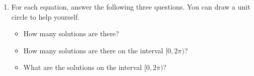 \documentclass{article}
\begin{document}
\begin{enumerate}
\begin{tasks}[after-item-skip=64pt]
    \task 
      \begin{problem}
        $\cos(-\pi/6)\solonly{=\frac{\sqrt{3}}{2}}$
      \end{problem}

    \task 
      \begin{problem}
        $\cos(-2\pi/3)\solonly{=-\frac{1}{2}}$
      \end{problem}

    \task 
      \begin{problem}
        $\sin(-7\pi/6)\solonly{=\frac{1}{2}}$
      \end{problem}

    \task 
      \begin{problem}
        $\cos(9\pi/2)\solonly{=0}$
      \end{problem}

    \task 
      \begin{problem}
        $\sin(25\pi/6)\solonly{=\frac{1}{2}}$
      \end{problem}

    \task 
      \begin{problem}
        $\cos(21\pi/4)\solonly{=-\frac{\sqrt{2}}{2}}$
      \end{problem}

    \task 
      \begin{problem}
        $\sin(-7\pi/3)\solonly{=-\frac{\sqrt{3}}{2}}$
      \end{problem}

    \task 
      \begin{problem}
        $\sin(210\pi)\solonly{=0}$
      \end{problem}

    \task 
      \begin{problem}
        $\cos (2025\pi)\solonly{=-1}$
      \end{problem}

    \end{tasks}
    \pspace{64pt}

\pspace{\newpage}

\item 

For each equation, answer the following three questions. You can draw a unit circle to help yourself.
\begin{itemize}
    \item How many solutions are there?
    \item How many solutions are there on the interval $[0,2\pi)$?
    \item What are the solutions on the interval $[0,2\pi)$?
\end{itemize}
    

\end{enumerate}
\end{document}
